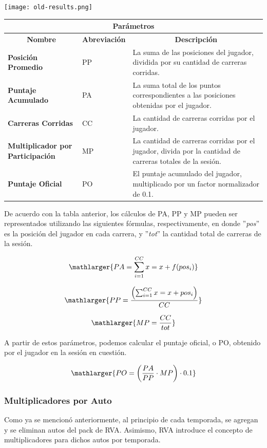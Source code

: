 \texttt{[image: old-results.png]}

\begin{center}
	\begin{tabular}{ | p{5cm} | l | p{8cm} |}
		\hline
		\multicolumn{3}{|c|}{\textbf{Parámetros}} \\
		\hline
		\multicolumn{1}{|c|}{\textbf{Nombre}} & \multicolumn{1}{|c|}{\textbf{Abreviación}} & \multicolumn{1}{|c|}{\textbf{Descripción}} \\
		\hline
		{\textbf{Posición Promedio}} & PP & La suma de las posiciones del jugador, dividida por su cantidad de carreras corridas. \\ \hline
		{\textbf{Puntaje Acumulado}} & PA & La suma total de los puntos correspondientes a las posiciones obtenidas por el jugador. \\ \hline
		{\textbf{Carreras Corridas}} & CC & La cantidad de carreras corridas por el jugador. \\ \hline
		{\textbf{Multiplicador por Participación}} & MP & La cantidad de carreras corridas por el jugador, divida por la cantidad de carreras totales de la sesión. \\ \hline
		{\textbf{Puntaje Oficial}} & PO & El puntaje acumulado del jugador, multiplicado por un factor normalizador de 0.1. \\ \hline
	\end{tabular}
\end{center}


De acuerdo con la tabla anterior, los cálculos de PA, PP y MP pueden ser representados utilizando las siguientes fórmulas, respectivamente, en donde ''\textit{pos}'' es la posición del jugador en cada carrera, y ''\textit{tot}'' la cantidad total de carreras de la sesión.

\[
\mathlarger{{PA} = \sum_{i=1}^{CC}x=x+f(pos_i)}
\]

\[
\mathlarger{{PP} = \frac{\left(\sum_{i=1}^{CC}x=x+pos_i\right)}{CC}}
\]

\[
\mathlarger{{MP} = \frac{CC}{tot}}
\]

A partir de estos parámetros, podemos calcular el puntaje oficial, o PO, obtenido por el jugador en la sesión en cuestión.

\[
\mathlarger{{PO} = \left(\frac{PA}{PP} \cdot MP\right) \cdot 0.1}
\]

\subsubsection{Multiplicadores por Auto}
Como ya se mencionó anteriormente, al principio de cada temporada, se agregan y se eliminan autos del pack de RVA. Asimismo, RVA introduce el concepto de multiplicadores para dichos autos por temporada.

